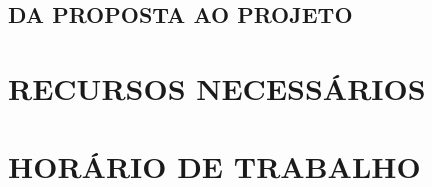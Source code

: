 \subsection{DA PROPOSTA AO PROJETO}

\section{RECURSOS NECESSÁRIOS}
\label{sec:recursos}

\section{HORÁRIO DE TRABALHO}
\label{sec:horário}


